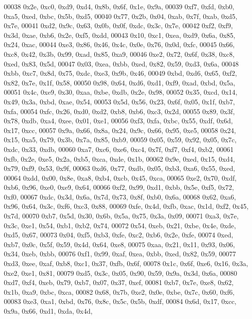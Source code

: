\begin{DoxyCode}
00038   0x2e, 0xc0, 0xd9, 0xd4, 0x8b, 0x6f, 0x1e, 0x9a,
00039   0xf7, 0xfd, 0xb0, 0xa5, 0xed, 0xbc, 0x5b, 0xd5,
00040   0x77, 0x2b, 0x04, 0xab, 0x7f, 0xab, 0xd5, 0x7e,
00041   0xd2, 0x9c, 0x63, 0x0b, 0x0f, 0xdc, 0x3c, 0x7e,
00042   0xf2, 0xf9, 0x3d, 0xae, 0xb6, 0x2e, 0xf5, 0xdd,
00043   0x10, 0xc1, 0xea, 0xd9, 0x6a, 0x85, 0x24, 0xac,
00044   0xe3, 0x86, 0x46, 0x4c, 0x0e, 0x76, 0x0d, 0xfc,
00045   0x66, 0xc8, 0x42, 0x3b, 0x99, 0xad, 0x85, 0xa9,
00046   0xe2, 0x72, 0x6f, 0x38, 0xc8, 0xed, 0x83, 0x5d,
00047   0x03, 0xea, 0xbb, 0xed, 0x82, 0x59, 0xd3, 0x6a,
00048   0xbb, 0xc7, 0x8d, 0x75, 0xdc, 0xe3, 0x9b, 0x46,
00049   0xbd, 0xd6, 0x65, 0xf2, 0x82, 0x7e, 0x1f, 0x58,
00050   0x98, 0x64, 0xd6, 0xd1, 0xf9, 0xad, 0xbd, 0x5a,
00051   0x4c, 0xe9, 0x30, 0xaa, 0xbe, 0xdb, 0x2e, 0x98,
00052   0x35, 0xcd, 0x14, 0x49, 0x3a, 0xbd, 0xae, 0x54,
00053   0x5d, 0x56, 0x23, 0x6f, 0x05, 0x1f, 0xb7, 0xfa,
00054   0xfc, 0x26, 0xd0, 0xd2, 0xb8, 0xb6, 0xc3, 0x2d,
00055   0x89, 0x3f, 0x78, 0xdb, 0xa4, 0xee, 0x01, 0xe1,
00056   0xf3, 0xfa, 0xbc, 0x55, 0xdf, 0x6d, 0x17, 0xcc,
00057   0x9a, 0x66, 0x8a, 0x24, 0x9c, 0x66, 0x95, 0xe5,
00058   0x24, 0x15, 0xa5, 0x79, 0x3b, 0x7a, 0x85, 0xb9,
00059   0x05, 0x59, 0x92, 0x05, 0x7c, 0xdc, 0x33, 0xdb,
00060   0xa7, 0xc6, 0xe6, 0xc4, 0x7f, 0xf7, 0xf4, 0xb2,
00061   0xfb, 0x2e, 0xe5, 0x2a, 0xb5, 0xca, 0xde, 0x1b,
00062   0x9e, 0xed, 0x15, 0xd4, 0x79, 0xf9, 0x53, 0x9f,
00063   0xd6, 0x77, 0xdb, 0x05, 0xb3, 0xa6, 0x55, 0xed,
00064   0xdd, 0x00, 0x8e, 0xa8, 0xb4, 0xcb, 0x45, 0xca,
00065   0xe2, 0x70, 0xdf, 0xb6, 0x96, 0xe0, 0xe9, 0x64,
00066   0xf2, 0x99, 0xd1, 0xbb, 0x5e, 0xf5, 0x72, 0xf0,
00067   0xdc, 0x3d, 0x6a, 0x7d, 0x73, 0x8f, 0xb0, 0x6a,
00068   0x62, 0xa6, 0x96, 0x64, 0x3c, 0xf6, 0xc3, 0x88,
00069   0xfe, 0x4d, 0xfb, 0xac, 0x1d, 0xf2, 0x45, 0x7d,
00070   0xb7, 0x5d, 0x30, 0x6b, 0x5a, 0x75, 0x3a, 0x09,
00071   0xa3, 0x7e, 0x3c, 0xe1, 0x54, 0xb1, 0xb2, 0x74,
00072   0x54, 0xeb, 0x21, 0xbe, 0x4e, 0xde, 0xd5, 0x67,
00073   0x04, 0xf5, 0xb3, 0xfe, 0xc2, 0xb6, 0x2e, 0xfe,
00074   0xed, 0xb7, 0x0c, 0x5f, 0x59, 0x4d, 0x64, 0xe8,
00075   0xaa, 0x21, 0x11, 0x93, 0x06, 0x34, 0xeb, 0xbb,
00076   0xf1, 0x99, 0xaf, 0xea, 0xbb, 0xed, 0x82, 0x59,
00077   0xd3, 0xee, 0xaf, 0xb8, 0xc1, 0x37, 0xfb, 0x6f,
00078   0x1c, 0x6f, 0xe6, 0x16, 0x3a, 0xe2, 0xe1, 0x81,
00079   0xd5, 0x3c, 0x05, 0x90, 0x59, 0x9a, 0x3d, 0x6a,
00080   0xd7, 0xf4, 0xeb, 0x79, 0xb7, 0x07, 0x37, 0xef,
00081   0xb7, 0x7e, 0xe8, 0x62, 0x1b, 0xa9, 0xbc, 0xca,
00082   0x68, 0x7b, 0xe2, 0x0e, 0xbe, 0x7c, 0x60, 0xf6,
00083   0xe3, 0xa1, 0xbd, 0x76, 0x8c, 0x5c, 0x5b, 0xdf,
00084   0x6d, 0x17, 0xcc, 0x9a, 0x66, 0xd1, 0xda, 0x4d,

\end{DoxyCode}
